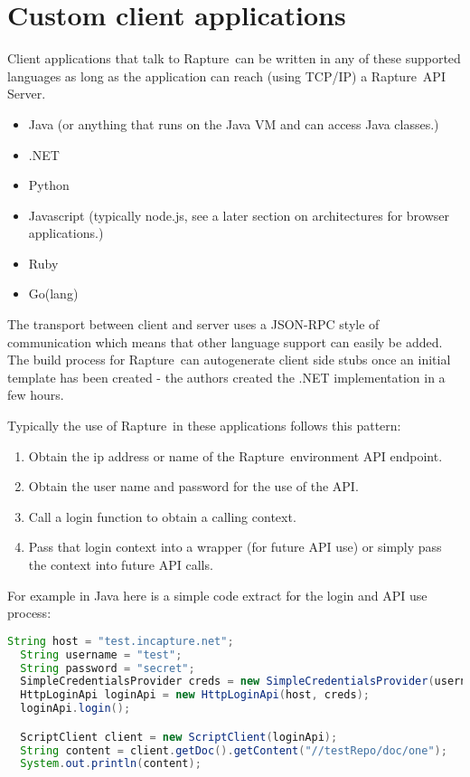 \documentclass[12pt,twoside,a4paper]{book}
\newcommand{\Rapture}{Rapture~}
\begin{document}
\section{Custom client applications}

Client applications that talk to \Rapture can be written in any of these supported languages as
long as the application can reach (using TCP/IP) a \Rapture API Server.

\begin{itemize}
  \item{Java (or anything that runs on the Java VM and can access Java classes.)}
  \item{.NET}
  \item{Python}
  \item{Javascript (typically node.js, see a later section on architectures for browser applications.)}
  \item{Ruby}
  \item{Go(lang)}
\end{itemize}

The transport between client and server uses a JSON-RPC style of communication which
means that other language support can easily be added. The build process for
\Rapture can autogenerate client side stubs once an initial template has been
created - the authors created the .NET implementation in a few hours.

Typically the use of \Rapture in these applications follows this pattern:

\begin{enumerate}
  \item{Obtain the ip address or name of the \Rapture environment API endpoint.}
  \item{Obtain the user name and password for the use of the API.}
  \item{Call a login function to obtain a calling context.}
  \item{Pass that login context into a wrapper (for future API use) or simply pass the context into future API calls.}
\end{enumerate}

For example in Java here is a simple code extract for the login and API use process:

\begin{lstlisting}[caption={Java simple example}, language=Java]
  String host = "test.incapture.net";
  String username = "test";
  String password = "secret";
  SimpleCredentialsProvider creds = new SimpleCredentialsProvider(username, password);
  HttpLoginApi loginApi = new HttpLoginApi(host, creds);
  loginApi.login();

  ScriptClient client = new ScriptClient(loginApi);
  String content = client.getDoc().getContent("//testRepo/doc/one");
  System.out.println(content);
\end{lstlisting}
\end{document}
